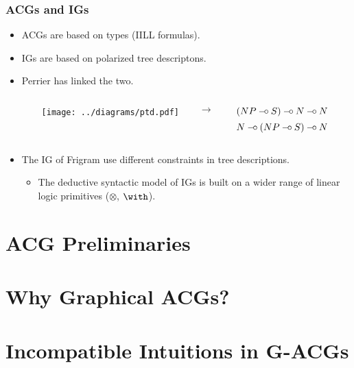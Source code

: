 \documentclass{beamer}
\def\limp {\mathbin{{-}\mkern-3.5mu{\circ}}}
\begin{document}
\begin{frame}
  \frametitle{ACGs and IGs}

  \begin{itemize}
  \item ACGs are based on types (IILL formulas).
  \item IGs are based on polarized tree descriptons.
  \item Perrier has linked the two.

    \vspace{2 mm}
    \begin{columns}[c]
      \begin{column}{0.25\textwidth}\end{column}
      \begin{column}{0.2\textwidth}
        \texttt{[image: ../diagrams/ptd.pdf]}
      \end{column}
      \begin{column}{0.1\textwidth}$\to$\end{column}
      \begin{column}{0.2\textwidth}
        $$(NP \limp S) \limp N \limp N$$
        $$N \limp (NP \limp S) \limp N$$
      \end{column}
      \begin{column}{0.25\textwidth}\end{column}
    \end{columns}
  \item The IG of Frigram use different constraints in tree
    descriptions.
    \begin{itemize}
    \item The deductive syntactic model of IGs is built on a wider range
      of linear logic primitives ($\otimes$, $\with$).
    \end{itemize}
  \end{itemize}
\end{frame}


\section{ACG Preliminaries}

\frame{}

\section{Why Graphical ACGs?}

\frame{}


\section{Incompatible Intuitions in G-ACGs}
\end{document}
